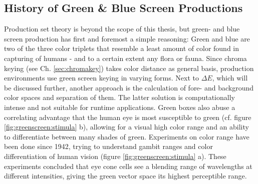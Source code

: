 \subsection{History of Green \& Blue Screen Productions}

Production set theory is beyond the scope of this thesis, but green- and blue 
screen production has first and foremost a simple reasoning: Green and blue are 
two of the three color triplets that resemble a least amount of color found in 
capturing of humans - and to a certain extent any flora or fauna. Since chroma 
keying (see Ch. \ref{sec:chromakey}) takes color distance as general basis, 
production environments use green screen keying in varying forms. Next to 
$\Delta E$, which will be discussed further, another approach is the 
calculation of fore- and background color spaces and separation of them. The 
latter solution is computationally intense and not suitable for runtime 
applications. \cite{disney:unmixing:2017}
\newline
Green boxes also abuse a correlating advantage that the human eye is most 
susceptible to green (cf. figure \ref{fig:greenscreen:stimula} b), allowing for 
a visual high color range and an ability to differentiate between many shades of
green. Experiments on color range have been done since 1942, trying to 
understand gambit ranges and color differentiation of human vision (figure 
\ref{fig:greenscreen:stimula} a). These experiments concluded that eye cone 
cells see a blending range of wavelengths at different intensities, giving the 
green vector space its highest perceptible range. \cite{MacAdam:1942}

